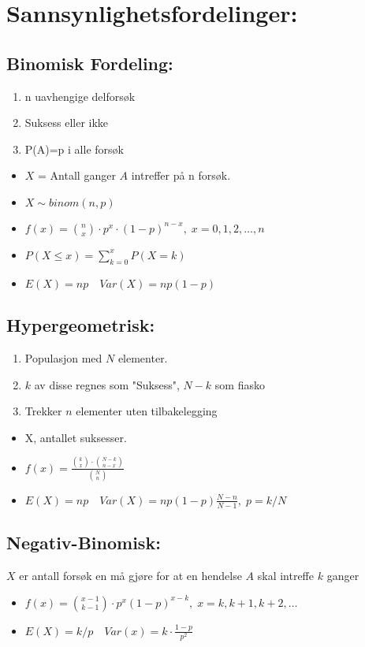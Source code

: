 \documentclass[8pt,a4paper,twocolumn,twoside]{article}
\def\forvar#1#2#3{E(#1)=#2 \quad Var(#1)=#3}
\begin{document}
\section*{Sannsynlighetsfordelinger:}
%
%
\subsection*{Binomisk Fordeling:}
\begin{enumerate}[topsep=0pt,itemsep=0pt, partopsep=0pt]
    \item n uavhengige delforsøk
    \item Suksess eller ikke
    \item P(A)=p i alle forsøk
\end{enumerate}
\begin{itemize}[topsep=0pt,itemsep=0pt, partopsep=0pt]
    \item $X$ = Antall ganger $A$ intreffer på n forsøk. 
    \item $X\sim binom(n,p)$
    \item $f(x)= \binom{n}{x} \cdot p^x\cdot (1-p)^{n-x},\; x=0,1,2,\dots,n$
    \item $P(X\leq x)= \sum_{k=0}^{x} P(X=k)$
    \item $E(X)=np\quad Var(X)=np(1-p)$
\end{itemize}
%
%
\subsection*{Hypergeometrisk:}
\begin{enumerate}[topsep=0pt,itemsep=0pt, partopsep=0pt]
    \item Populasjon med $N$ elementer.
    \item $k$ av disse regnes som "Suksess", $N-k$ som fiasko
    \item Trekker $n$ elementer uten tilbakelegging
\end{enumerate}
\begin{itemize}[topsep=0pt,itemsep=0pt, partopsep=0pt]
    \item X, antallet suksesser.
    \item $f(x)=\frac{\binom{k}{x}\cdot\binom{N-k}{n-x}}{\binom{N}{n}}$
    \item $\forvar{X}{np}{np(1-p)\frac{N-n}{N-1}},\;p=k/N$
\end{itemize}
%
%
\subsection*{Negativ-Binomisk:}
$X$ er antall forsøk en må gjøre for at en hendelse $A$ skal intreffe $k$ ganger
\begin{itemize}[topsep=0pt,itemsep=0pt, partopsep=0pt]
    \item $f(x) = \binom{x-1}{k-1}\cdot p^x(1-p)^{x-k},\;x=k,k+1,k+2,\dots$
    \item $E(X)=k/p\quad Var(x)=k\cdot\frac{1-p}{p^2}$
\end{itemize}
%
%
\end{document}
